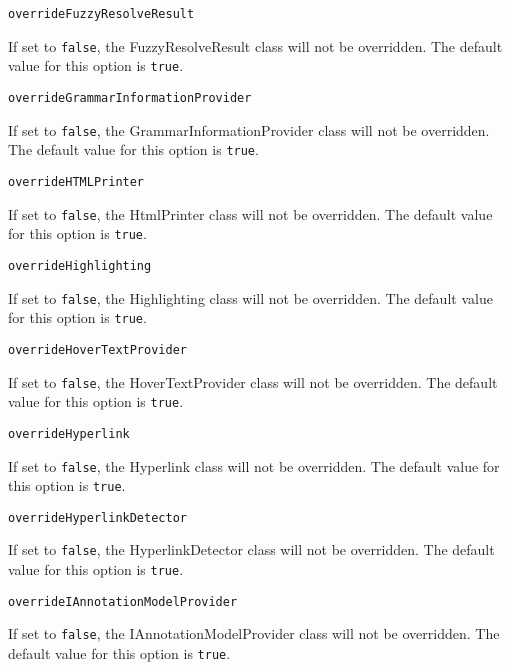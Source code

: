 \noindent\texttt{overrideFuzzyResolveResult}
\begin{myindentpar}{1cm}
If set to \texttt{false}, the FuzzyResolveResult class will not be overridden. The default value for this option is \texttt{true}.
\end{myindentpar}

\noindent\texttt{overrideGrammarInformationProvider}
\begin{myindentpar}{1cm}
If set to \texttt{false}, the GrammarInformationProvider class will not be overridden. The default value for this option is \texttt{true}.
\end{myindentpar}

\noindent\texttt{overrideHTMLPrinter}
\begin{myindentpar}{1cm}
If set to \texttt{false}, the HtmlPrinter class will not be overridden. The default value for this option is \texttt{true}.
\end{myindentpar}

\noindent\texttt{overrideHighlighting}
\begin{myindentpar}{1cm}
If set to \texttt{false}, the Highlighting class will not be overridden. The default value for this option is \texttt{true}.
\end{myindentpar}

\noindent\texttt{overrideHoverTextProvider}
\begin{myindentpar}{1cm}
If set to \texttt{false}, the HoverTextProvider class will not be overridden. The default value for this option is \texttt{true}.
\end{myindentpar}

\noindent\texttt{overrideHyperlink}
\begin{myindentpar}{1cm}
If set to \texttt{false}, the Hyperlink class will not be overridden. The default value for this option is \texttt{true}.
\end{myindentpar}

\noindent\texttt{overrideHyperlinkDetector}
\begin{myindentpar}{1cm}
If set to \texttt{false}, the HyperlinkDetector class will not be overridden. The default value for this option is \texttt{true}.
\end{myindentpar}

\noindent\texttt{overrideIAnnotationModelProvider}
\begin{myindentpar}{1cm}
If set to \texttt{false}, the IAnnotationModelProvider class will not be overridden. The default value for this option is \texttt{true}.
\end{myindentpar}

